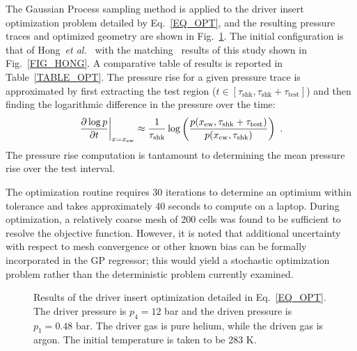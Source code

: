 The Gaussian Process sampling method is applied to the driver insert optimization problem detailed by Eq.~\ref{EQ_OPT}, and the resulting pressure traces and optimized geometry are shown in Fig.~\ref{FIG_OPT}. The initial configuration is that of Hong~\emph{et al.}~\cite{HONG_PANG_VASU_DAVIDSON_HANSON_SW2009} with the matching \stnshk\ results of this study shown in Fig.~\ref{FIG_HONG}. A comparative table of results is reported in Table~\ref{TABLE_OPT}. The pressure rise for a given pressure trace is approximated by first extracting the test region ($t\in[\tau_\mathrm{shk},\tau_\mathrm{shk}+\tau_\mathrm{test}]$) and then finding the logarithmic difference in the pressure over the time:
\begin{equation}\label{EQ_PR}
\left . \frac{\p \log p}{\p t}\right |_{x=x_\mathrm{ew}}\approx\frac{1}{\tau_\mathrm{shk}}\log\left (\frac{ p(x_\mathrm{ew},\tau_\mathrm{shk}+\tau_\mathrm{test})}{p(x_\mathrm{ew},\tau_\mathrm{shk})}\right)\ .
\end{equation}
The pressure rise computation is tantamount to determining the mean pressure rise over the test interval. 

The optimization routine requires 30 iterations to determine an optimium within tolerance and takes approximately 40 seconds to compute on a laptop. During optimization, a relatively coarse mesh of 200 cells was found to be sufficient to resolve the objective function. However, it is noted that additional uncertainty with respect to mesh convergence or other known bias can be formally incorporated in the GP regressor; this would yield a stochastic optimization problem rather than the deterministic problem currently examined.   

\begin{figure}[!ht!]
	\centering
	\caption{\label{FIG_OPT} Results of the driver insert optimization detailed in Eq.~\ref{EQ_OPT}. The driver pressure is $p_4=12$ bar and the driven pressure is $p_1=0.48$ bar. The driver gas is pure helium, while the driven gas is argon. The initial temperature is taken to be 283 K.}
\end{figure}

